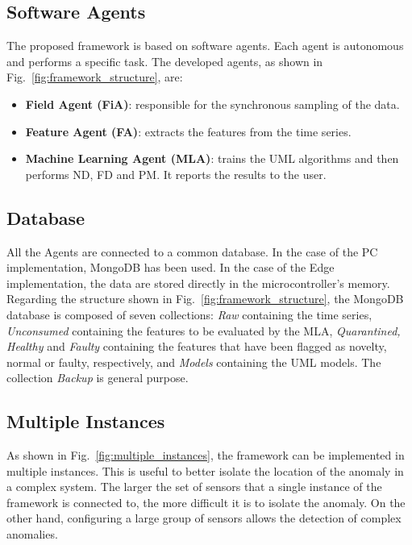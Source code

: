 \subsection{Software Agents}
The proposed framework is based on software agents. Each agent is autonomous and performs a specific task. The developed agents, as shown in Fig.~\ref{fig:framework_structure}, are:
\begin{itemize}
    \item \textbf{Field Agent (FiA)}: responsible for the synchronous sampling of the data.
    \item \textbf{Feature Agent (FA)}: extracts the features from the time series.
    \item \textbf{Machine Learning Agent (MLA)}: trains the UML algorithms and then performs ND, FD and PM. It reports the results to the user.
\end{itemize}

\subsection{Database}
All the Agents are connected to a common database. In the case of the PC implementation, MongoDB has been used. In the case of the Edge implementation, the data are stored directly in the microcontroller's memory.
Regarding the structure shown in Fig.~\ref{fig:framework_structure}, the MongoDB database is composed of seven collections: \emph{Raw} containing the time series, \emph{Unconsumed} containing the features to be evaluated by the MLA, \emph{Quarantined, Healthy} and \emph{Faulty} containing the features that have been flagged as novelty, normal or faulty, respectively, and \emph{Models} containing the UML models. The collection \emph{Backup} is general purpose.

\subsection{Multiple Instances}
As shown in Fig.~\ref{fig:multiple_instances}, the framework can be implemented in multiple instances. This is useful to better isolate the location of the anomaly in a complex system. The larger the set of sensors that a single instance of the framework is connected to, the more difficult it is to isolate the anomaly. On the other hand, configuring a large group of sensors allows the detection of complex anomalies.

